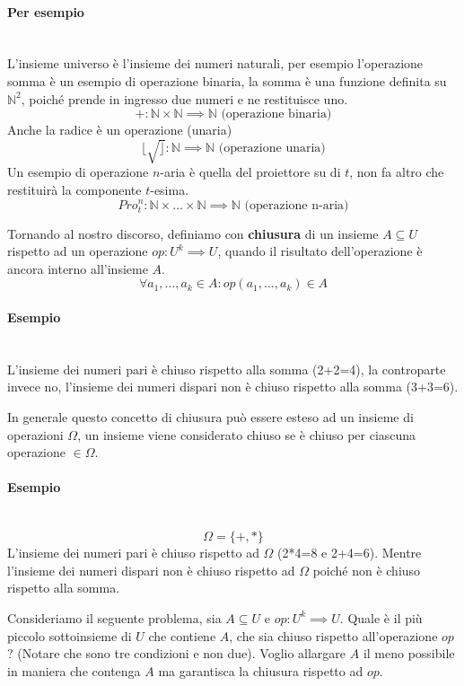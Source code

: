 \documentclass{article}
\begin{document}
\paragraph{Per esempio}\mbox{}\\
L'insieme universo è l'insieme dei numeri naturali, per esempio l'operazione somma è un
esempio di operazione binaria, la somma è una funzione definita su $\mathbb{N}^2$, poiché
prende in ingresso due numeri e ne restituisce uno.
$$+:\mathbb{N}\times\mathbb{N}\implies\mathbb{N}\text{ (operazione binaria)}$$
Anche la radice è un operazione (unaria)
$$\lfloor\sqrt\rfloor:\mathbb{N}\implies\mathbb{N}\text{ (operazione unaria)}$$
Un esempio di operazione $n$-aria è quella del proiettore su di $t$, non
fa altro che restituirà la componente $t$-esima.
$$Pro_t^n:\mathbb{N}\times\dots\times\mathbb{N}\implies\mathbb{N}\text{ (operazione n-aria)}$$

Tornando al nostro discorso, definiamo con \textbf{chiusura} di un insieme $A\subseteq U$
rispetto ad un operazione $op:U^k\implies U$, quando il risultato dell'operazione è ancora
interno all'insieme $A$.
$$\forall a_1,\dots,a_k\in A:op(a_1,\dots,a_k)\in A$$

\paragraph{Esempio}\mbox{}\\
L'insieme dei numeri pari è chiuso rispetto alla somma (2+2=4), la controparte invece no, l'insieme
dei numeri dispari non è chiuso rispetto alla somma (3+3=6).

In generale questo concetto di chiusura può essere esteso ad un insieme di operazioni $\Omega$,
un insieme viene considerato chiuso se è chiuso per ciascuna operazione $\in\Omega$.
\paragraph{Esempio}\mbox{}\\
$$\Omega=\{+,*\}$$
L'insieme dei numeri pari è chiuso rispetto ad $\Omega$ (2*4=8 e 2+4=6). Mentre l'insieme
dei numeri dispari non è chiuso rispetto ad $\Omega$ poiché non è chiuso rispetto alla somma.

Consideriamo il seguente problema, sia $A\subseteq U$ e $op:U^k\implies U$. Quale è il più
piccolo sottoinsieme di $U$ che contiene $A$, che sia chiuso rispetto all'operazione $op$?
(Notare che sono tre condizioni e non due). Voglio allargare $A$ il meno possibile in maniera
che contenga $A$ ma garantisca la chiusura rispetto ad $op$.
\end{document}
